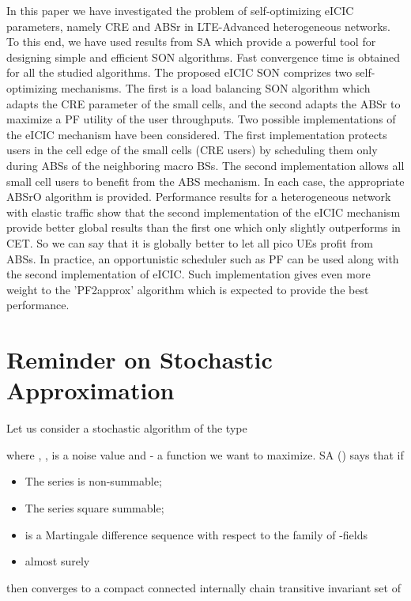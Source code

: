 \documentclass[conference]{IEEEtran}
\begin{document}
In this paper we have investigated the problem of self-optimizing \ac{eICIC} parameters, namely \ac{CRE} and \ac{ABSr} in LTE-Advanced heterogeneous networks. To this end, we have used results from \ac{SA} which provide a powerful tool for designing simple and efficient \ac{SON} algorithms. Fast convergence time is obtained for all the studied algorithms. The proposed \ac{eICIC} \ac{SON} comprizes two self-optimizing mechanisms. The first is a load balancing \ac{SON} algorithm which adapts the \ac{CRE} parameter of the small cells, and the second adapts the \ac{ABSr} to maximize a \ac{PF} utility of the user throughputs. Two possible implementations of the \ac{eICIC} mechanism have been considered. The first implementation protects users in the cell edge of the small cells (\ac{CRE} users) by scheduling them only during \acp{ABS} of the neighboring macro \acp{BS}. The second implementation allows all small cell users to benefit from the \ac{ABS} mechanism. In each case, the appropriate \ac{ABSrO} algorithm is provided. Performance results for a heterogeneous network with elastic traffic show that the second implementation of the eICIC mechanism provide better global results than the first one which only slightly outperforms in \ac{CET}. So we can say that it is globally better to let all pico \acp{UE} profit from \acp{ABS}. In practice, an opportunistic scheduler such as PF can be used along with the second implementation of \ac{eICIC}. Such implementation gives even more weight to the 'PF2approx' algorithm which is expected to provide the best performance.


\appendices
\section{Reminder on Stochastic Approximation} \label{app:rem_sa}
	Let us consider a stochastic algorithm of the type
	
	where , ,  is a noise value and  - a function we want to maximize.
	\ac{SA} (\cite[Theorem 2 P16]{Borkar}) says that if
	\begin{itemize}
	\item The series  is non-summable; 
	\item The series  square summable; 
	\item  is a Martingale difference sequence with respect to the family of -fields 
	\item  almost surely
	\end{itemize}
	then  converges to a compact connected internally chain transitive invariant set of
	
\end{document}
